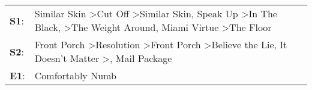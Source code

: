 \begin{supertabular}{p{0.03\textwidth}p{0.92\textwidth}}
 \textbf{S1}:  &  Similar Skin\textsuperscript{} \textgreater \enspace Cut Off\textsuperscript{} \textgreater \enspace Similar Skin\textsuperscript{}, \enspace Speak Up\textsuperscript{} \textgreater \enspace In The Black\textsuperscript{}, \textsuperscript{} \textgreater \enspace The Weight Around\textsuperscript{}, \enspace Miami Virtue\textsuperscript{} \textgreater \enspace The Floor\textsuperscript{}  \enspace  \\
 \textbf{S2}:  &                                                                                     Front Porch\textsuperscript{} \textgreater \enspace Resolution\textsuperscript{} \textgreater \enspace Front Porch\textsuperscript{} \textgreater \enspace Believe the Lie\textsuperscript{}, \enspace It Doesn't Matter\textsuperscript{} \textgreater {}\textsuperscript{}, \enspace Mail Package\textsuperscript{}  \enspace  \\
 \textbf{E1}:  &                                                                                                                                                                                                                                                                                                                                                                                   Comfortably Numb\textsuperscript{}  \enspace  \\
\end{supertabular}
